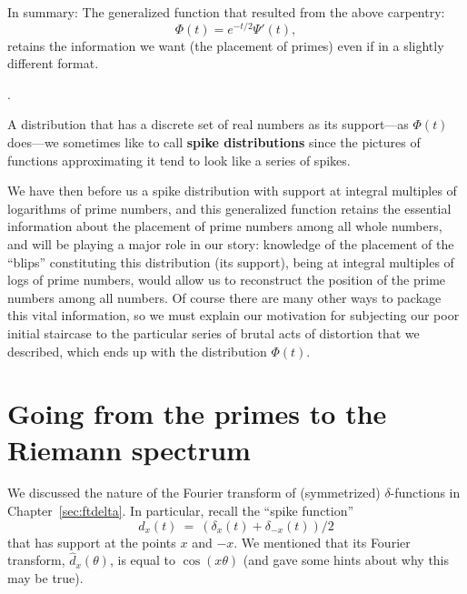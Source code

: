 \documentclass[openany]{book}
\theoremstyle{plain}
\theoremstyle{definition}
\newcommand{\todo}[1]{\par\vspace{1em}{\small---------\\{{\bf To be done:} #1}\\-----------}\par\vspace{1em}}
\begin{document}
{{%


In summary: The generalized function that resulted from the above carpentry:
  $$\Phi(t) = e^{-t/2}\Psi'(t),$$ retains the information we want (the placement of primes) even if in a slightly different format.
}.%


A distribution that has a discrete set of real numbers as its
  support---as $\Phi(t)$ does---we sometimes like to call {\bf spike
    distributions} since the pictures of functions approximating it
  tend to look like a series of spikes.

  We have then before us a spike distribution with support at integral
  multiples of logarithms of prime numbers, and this generalized
  function retains the essential information about the placement of
  prime numbers among all whole numbers, and will be playing a major
  role in our story: knowledge of the placement of the ``blips'' constituting this distribution (its
support), being at  integral multiples of logs of prime numbers, would allow us to reconstruct the position of the prime
numbers among all numbers. Of course there are many other ways to package this vital information, so we
must explain our motivation for subjecting our poor initial staircase
to the particular series of brutal acts of distortion that we
described, which ends up with the distribution $\Phi(t)$.







\chapter[From primes to the Riemann spectrum]{Going from
the primes to the Riemann spectrum}
\label{ch:prime-to-spectrum}



We  discussed the nature of the Fourier transform of (symmetrized)
$\delta$-functions in Chapter~\ref{sec:ftdelta}. In particular, recall
the ``spike function'' $$d_x(t) \ = \ (\delta_x(t) +
\delta_{-x}(t))/2$$ that has support at the points $x$ and $-x$.  We
mentioned that its Fourier transform, ${\hat d}_x(\theta)$, is equal
to $\cos(x\theta)$ (and gave some hints about why this may be true).


}
\end{document}
